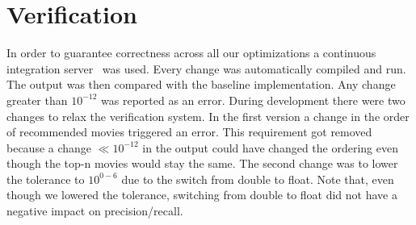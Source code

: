 \section{Verification}\label{sec:verification}
In order to guarantee correctness across all our optimizations a continuous integration server~\cite{jenkins} was used. Every change was automatically compiled and run. The output was then compared with the baseline implementation. Any change greater than $10^{-12}$ was reported as an error. During development there were two changes to relax the verification system. In the first version a change in the order of recommended movies triggered an error. This requirement got removed because a change $ \ll 10^{-12}$ in the output could have changed the ordering even though the top-n movies would stay the same. The second change was to lower the tolerance to $10^{0-6}$ due to the switch from double to float. Note that, even though we lowered the tolerance, switching from double to float did not have a negative impact on precision/recall.